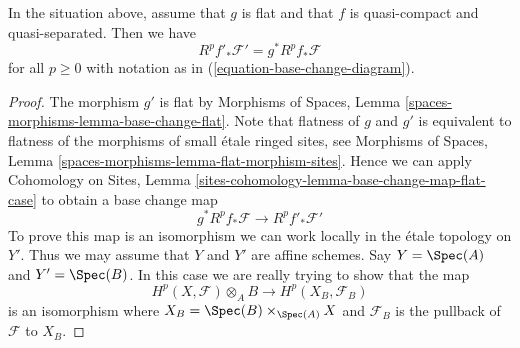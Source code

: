 \begin{lemma}
\label{lemma-flat-base-change-cohomology}
In the situation above, assume that $g$ is flat and that $f$
is quasi-compact and quasi-separated.
Then we have
$$
R^pf'_*\mathcal{F}' = g^*R^pf_*\mathcal{F}
$$
for all $p \geq 0$ with notation as in (\ref{equation-base-change-diagram}).
\end{lemma}

\begin{proof}
The morphism $g'$ is flat by
Morphisms of Spaces, Lemma \ref{spaces-morphisms-lemma-base-change-flat}.
Note that flatness of $g$ and $g'$ is equivalent to flatness
of the morphisms of small \'etale ringed sites, see
Morphisms of Spaces, Lemma \ref{spaces-morphisms-lemma-flat-morphism-sites}.
Hence we can apply
Cohomology on Sites, Lemma
\ref{sites-cohomology-lemma-base-change-map-flat-case}
to obtain a base change map
$$
g^*R^pf_*\mathcal{F} \longrightarrow R^pf'_*\mathcal{F}'
$$
To prove this map is an isomorphism we can work locally in the \'etale
topology on $Y'$. Thus we may assume that $Y$ and $Y'$ are affine
schemes. Say $Y = \Spec(A)$ and $Y' = \Spec(B)$.
In this case we are really trying to show that the map
$$
H^p(X, \mathcal{F}) \otimes_A B \longrightarrow H^p(X_B, \mathcal{F}_B)
$$
is an isomorphism where $X_B = \Spec(B) \times_{\Spec(A)} X$ and
$\mathcal{F}_B$ is the pullback of $\mathcal{F}$ to $X_B$.


\end{proof}

